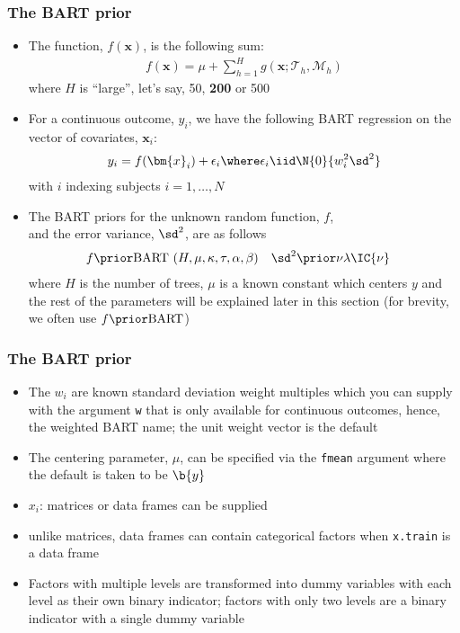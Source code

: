 \documentclass[11pt,dvipsnames,usenames,times]{beamer}
\newcommand*{\BART}{\mathrm{BART}\ }
\newcommand*{\code}[1]{{\tt #1}}
\begin{document}
\begin{frame}[fragile]
\frametitle{The BART prior}
\begin{itemize}
\item
The function, $f(\bm{x})$, is the following sum:
\begin{align*}
f(\bm{x})=\mu+\sum_{h=1}^H g(\bm{x}; \mathcal{T}_h, \mathcal{M}_h)
\end{align*} 
where $H$ is ``large'', let's say, 50, {\bf 200} or 500
\item For a continuous outcome, $y_i$, we have the following BART regression
on the vector of covariates, $\bm{x}_i$:
\begin{align*}
y_i=f(\bm{x}_i)+\epsilon_i \where \epsilon_i \iid \N{0}{ w_i^2
  \sd^2}
\end{align*}
with $i$ indexing subjects $i=1, \dots, N$
\item The BART priors for the unknown random
function, $f$,\\ and the error variance, $\sd^2$, are 
as follows
\begin{align*}
f &\prior\BART(H, \mu, \kappa, \tau, \alpha, \beta) &
\sd^2 & \prior \nu \lambda \IC{\nu} 
\end{align*}
where $H$ is the number of trees, $\mu$ is a known constant which
centers ${y}$ and the rest of the parameters will be explained later
in this section (for brevity, we often use
$f \prior\mathrm{BART}$)
\end{itemize}
\end{frame}

\begin{frame}[fragile]
\frametitle{The BART prior}
\begin{itemize}
\item The $w_i$ are known standard
deviation weight multiples which you can supply with the argument
\code{w} that is only available for continuous outcomes, hence, the
weighted BART name; the unit weight vector is the default
\item The
centering parameter, $\mu$, can be specified via the \code{fmean}
argument where the default is taken to be $\b{y}$
\item $x_i$: matrices or data frames can be supplied 
\item
unlike matrices, data frames can contain categorical factors
 when \code{x.train} is a data frame
\item Factors with multiple levels are transformed into dummy
variables with each level as their own binary
indicator; %
factors with only two levels are a binary indicator with a
single dummy variable
\end{itemize}
\end{frame}
\end{document}
